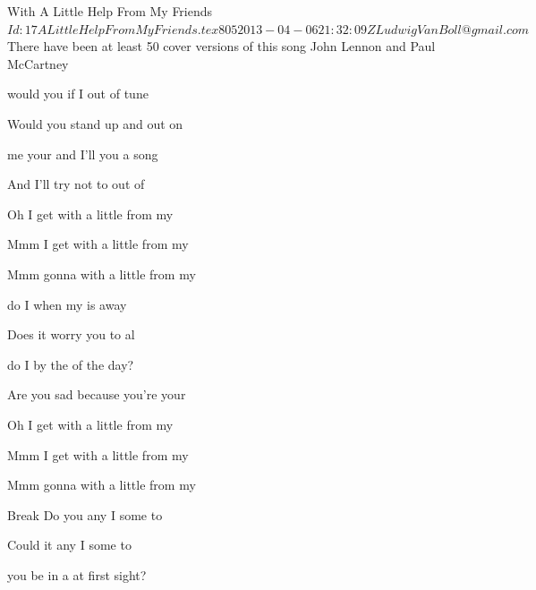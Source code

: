 \begin{SBSong}{With A Little Help From My Friends}
  {$Id: 17ALittleHelpFromMyFriends.tex 805 2013-04-06 21:32:09Z LudwigVanBoll@gmail.com $}
  {There have been at least 50 cover versions of this song}
  {John Lennon and Paul McCartney}
  \begin{SBVerse}
	 would you  if I  out of tune 

	Would you stand up and  out on 

	 me your  and I'll  you a song 

	And I'll try not to  out of  
  \end{SBVerse}
  \begin{SBChorus}   
	Oh I get  with a little  from my 

	Mmm I get  with a little  from my 

	Mmm gonna  with a little  from my 
  \end{SBChorus}
  \begin{SBVerse}
	 do I  when my  is away 

	Does it worry you to  al

	do I  by the  of the day?

	Are you sad because you're  your  
  \end{SBVerse}
  \begin{SBChorus}  
	Oh I get  with a little  from my 

	Mmm I get  with a little  from my 

	Mmm gonna  with a little  from my 
  \end{SBChorus}
  \begin{SBBracket}{Break}
	Do you  any I  some to 

	Could it  any I  some to 
  \end{SBBracket}
  \CBPageBrk
  \begin{SBVerse}
	 you be in a  at first sight? 


\end{SBVerse}
\end{SBSong}
